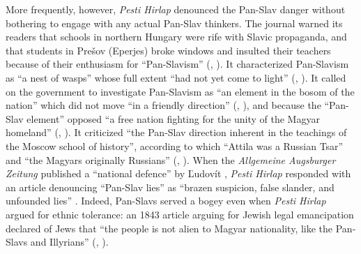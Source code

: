 More frequently, however, \textit{Pesti Hirlap} denounced the Pan-Slav danger without bothering to engage with any actual Pan-Slav thinkers. The journal warned its readers that schools in northern Hungary were rife with Slavic propaganda, and that students in Prešov (Eperjes) broke windows and insulted their teachers because of their enthusiasm for “Pan-Slavism” (, \cite[437]{anon_videki_1841}). It characterized Pan-Slavism as “a nest of wasps” whose full extent “had not yet come to light” (, \cite[640]{anon_megyei_1842}). It called on the government to investigate Pan-Slavism as “an element in the bosom of the nation” which did not move “in a friendly direction” (, \cite[689]{anon_magyarorszag_1842-1}), and because the “Pan-Slav element” opposed “a free nation fighting for the unity of the Magyar homeland” (, \cite[38]{anon_magyar_1843}). It criticized “the Pan-Slav direction inherent in the teachings of the Moscow school of history”, according to which “Attila was a Russian Tsar” and “the Magyars originally Russians” (, \cite[98]{anon_magyar_1841}). When the \textit{Allgemeine Augsburger Zeitung} published a “national defence” by Ľudovít \citet{stur_sprachenkampf_1843}, \textit{Pesti Hirlap} responded with an article denouncing “Pan-Slav lies” as “brazen suspicion, false slander, and unfounded lies” \citep[89]{sores_ismet_1844}. Indeed, Pan-Slavs served a bogey even when \textit{Pesti Hirlap} argued for ethnic tolerance: an 1843 article arguing for Jewish legal emancipation declared of Jews that “the people is not alien to Magyar nationality, like the Pan-Slavs and Illyrians” (, \cite[704]{anon_lxxv_1843}).

